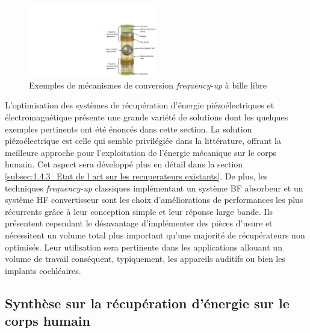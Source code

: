 \begin{figure}[!htbp]
	\begin{center}
		\captionsetup{justification=centering}
		\includegraphics[trim={20cm 0cm 0cm 5cm},clip, width=0.5\textwidth]{../Chap1/Figure/free_ball.pdf}
		\caption{Exemples de mécanismes de conversion \emph{frequency-up} à bille libre \cite{Halim2015}}
		\label{fig:frequency-up free_ball}
	\end{center}
\end{figure}

L'optimisation des systèmes de récupération d'énergie piézoélectriques et électromagnétique présente une grande variété de solutions dont les quelques exemples pertinents ont été énoncés dans cette section. La solution piézoélectrique est celle qui semble privilégiée dans la littérature, offrant la meilleure approche pour l'exploitation de l'énergie mécanique sur le corps humain. Cet aspect sera développé plus en détail dans la section \ref{subsec:1.4.3_Etat de l art sur les recuperateurs existants}. De plus, les techniques \emph{frequency-up} classiques implémentant un système BF absorbeur et un système HF convertisseur sont les choix d'améliorations de performances les plus récurrents grâce à leur conception simple et leur réponse large bande. Ils présentent cependant le désavantage d'implémenter des pièces d'usure et nécessitent un volume total plus important qu'une majorité de récupérateurs non optimisés. Leur utilisation sera pertinente dans les applications allouant un volume de travail conséquent, typiquement, les appareils auditifs ou bien les implants cochléaires.

	\subsection{Synthèse sur la récupération d'énergie sur le corps humain}
	\label{subsec:1.3.5_Synthese sur la recuperation d energie sur le corps humain}

